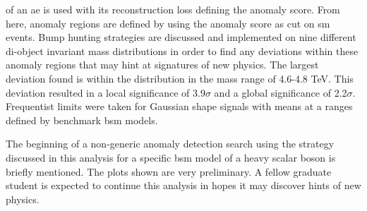 of an \gls{ae} is used with its reconstruction loss defining the anomaly score. From here, anomaly regions are defined by using the anomaly score as cut on \gls{sm} events.
Bump hunting strategies are discussed and implemented on nine different di-object invariant mass distributions in order to find any deviations within these anomaly regions 
that may hint at signatures of new physics. The largest deviation found is within the \mjmu distribution in the mass range of 4.6-4.8 TeV. This deviation resulted in a 
local significance of 3.9$\sigma$ and a global significance of 2.2$\sigma$. Frequentist limits were taken for Gaussian shape signals with means at a ranges defined by 
benchmark \gls{bsm} models. 
\par
The beginning of a non-generic anomaly detection search using the strategy discussed in this analysis for a specific \gls{bsm} model of a heavy scalar boson is briefly mentioned. 
The plots shown are very preliminary. A fellow graduate student is expected to continue this analysis in hopes it may discover hints of new physics. 
